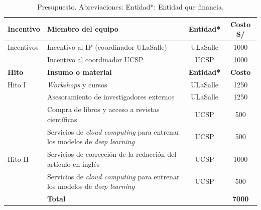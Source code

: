 \documentclass[a4paper,11pt]{article}
\begin{document}
\begin{table}[H]
	\centering
	\setlength{\tabcolsep}{0.5em} %
	{\renewcommand{\arraystretch}{1.7}%
		\caption{Presupuesto. Abreviaciones: Entidad*: Entidad que financia.}
		\label{tab:presupuesto}
  {\small
		\begin{tabular}{|p{2cm}|p{11.6cm}|c|c|} \hline
			\textbf{Incentivo}    & \textbf{Miembro del equipo}    & \textbf{Entidad* } & \textbf{Costo S/} \\ \hline
			Incentivos & Incentivo al IP (coordinador ULaSalle)          & ULaSalle                             & 1000           \\
			& Incentivo al coordinador  UCSP & UCSP                 & 1000                       \\ \hline \hline
			
			\textbf{Hito}    & \textbf{Insumo o material}    &  \textbf{Entidad*} & \textbf{Costo} \\ \hline
			Hito I & \textit{Workshops} y cursos                        &  ULaSalle           & 1250           \\
			
			
			& Asesoramiento de investigadores externos      & ULaSalle                             & 1250           \\

                & Compra de libros y acceso a revistas científicas      & UCSP                             & 500           \\

                & Servicios de \textit{cloud computing} para entrenar los modelos  de \textit{deep learning}       & UCSP                             & 500           \\
   
			 \hline
			Hito II &  Servicios de corrección de la redacción del artículo en inglés   & UCSP                             & 1000           \\
                
                
   			

                & Servicios de \textit{cloud computing} para entrenar los modelos  de \textit{deep learning}     & UCSP                             & 500           \\
			 
			 \hline
			& \textbf{Total}                                          &                 & \textbf{7000}         \\ 
			
			
			\hline
		\end{tabular}
  }
	}
\end{table}
\end{document}
